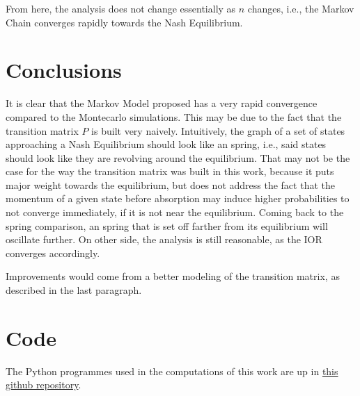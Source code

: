 \documentclass{article}
\begin{document}
From here, the analysis does not change essentially as $n$ changes, i.e., the Markov Chain converges rapidly towards the Nash Equilibrium.\par

\section{Conclusions}\label{sec5}
It is clear that the Markov Model proposed has a very rapid convergence compared to the Montecarlo simulations. This may be due to the fact that the transition matrix $P$ is built very naively. Intuitively, the graph of a set of states approaching a Nash Equilibrium should look like an spring, i.e., said states should look like they are revolving around the equilibrium. That may not be the case for the way the transition matrix was built in this work, because it puts major weight towards the equilibrium, but does not address the fact that the momentum of a given state before absorption may induce higher probabilities to not converge immediately, if it is not near the equilibrium. Coming back to the spring comparison, an spring that is set off farther from its equilibrium will oscillate further. On other side, the analysis is still reasonable, as the IOR converges accordingly.\par
Improvements would come from a better modeling of the transition matrix, as described in the last paragraph.\par 

\section*{Code}
The Python programmes used in the computations of this work are up in \href{https://github.com/NeutralElement/Stochastic-Processes-Project}{this github repository}.

\newpage




\end{document}
